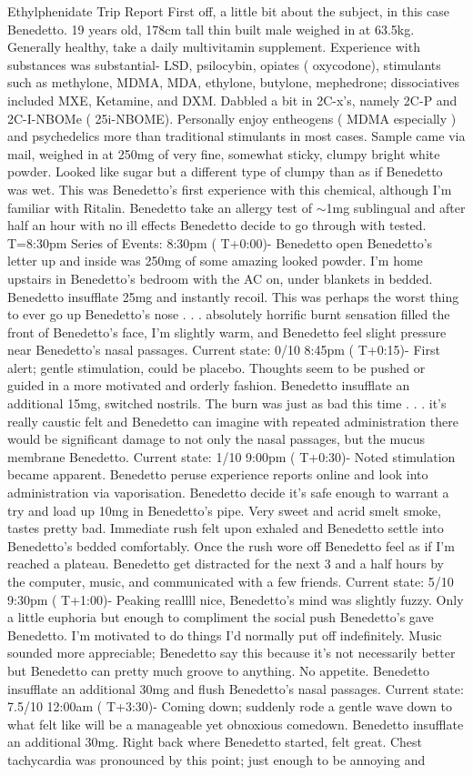 \documentclass[12pt]{book}
\begin{document}
Ethylphenidate Trip Report First off, a little bit about the subject, in this case Benedetto. 19 years old, 178cm tall thin built male weighed in at 63.5kg. Generally healthy, take a daily multivitamin supplement. Experience with substances was substantial- LSD, psilocybin, opiates ( oxycodone), stimulants such as methylone, MDMA, MDA, ethylone, butylone, mephedrone; dissociatives included MXE, Ketamine, and DXM. Dabbled a bit in 2C-x's, namely 2C-P and 2C-I-NBOMe ( 25i-NBOME). Personally enjoy entheogens ( MDMA especially ) and psychedelics more than traditional stimulants in most cases. Sample came via mail, weighed in at 250mg of very fine, somewhat sticky, clumpy bright white powder. Looked like sugar but a different type of clumpy than as if Benedetto was wet. This was Benedetto's first experience with this chemical, although I'm familiar with Ritalin. Benedetto take an allergy test of $\sim$1mg sublingual and after half an hour with no ill effects Benedetto decide to go through with tested. T=8:30pm Series of Events: 8:30pm ( T+0:00)- Benedetto open Benedetto's letter up and inside was 250mg of some amazing looked powder. I'm home upstairs in Benedetto's bedroom with the AC on, under blankets in bedded. Benedetto insufflate 25mg and instantly recoil. This was perhaps the worst thing to ever go up Benedetto's nose . . .  absolutely horrific burnt sensation filled the front of Benedetto's face, I'm slightly warm, and Benedetto feel slight pressure near Benedetto's nasal passages. Current state: 0/10 8:45pm ( T+0:15)- First alert; gentle stimulation, could be placebo. Thoughts seem to be pushed or guided in a more motivated and orderly fashion. Benedetto insufflate an additional 15mg, switched nostrils. The burn was just as bad this time . . .  it's really caustic felt and Benedetto can imagine with repeated administration there would be significant damage to not only the nasal passages, but the mucus membrane Benedetto. Current state: 1/10 9:00pm ( T+0:30)- Noted stimulation became apparent. Benedetto peruse experience reports online and look into administration via vaporisation. Benedetto decide it's safe enough to warrant a try and load up 10mg in Benedetto's pipe. Very sweet and acrid smelt smoke, tastes pretty bad. Immediate rush felt upon exhaled and Benedetto settle into Benedetto's bedded comfortably. Once the rush wore off Benedetto feel as if I'm reached a plateau. Benedetto get distracted for the next 3 and a half hours by the computer, music, and communicated with a few friends. Current state: 5/10 9:30pm ( T+1:00)- Peaking reallll nice, Benedetto's mind was slightly fuzzy. Only a little euphoria but enough to compliment the social push Benedetto's gave Benedetto. I'm motivated to do things I'd normally put off indefinitely. Music sounded more appreciable; Benedetto say this because it's not necessarily better but Benedetto can pretty much groove to anything. No appetite. Benedetto insufflate an additional 30mg and flush Benedetto's nasal passages. Current state: 7.5/10 12:00am ( T+3:30)- Coming down; suddenly rode a gentle wave down to what felt like will be a manageable yet obnoxious comedown. Benedetto insufflate an additional 30mg. Right back where Benedetto started, felt great. Chest tachycardia was pronounced by this point; just enough to be annoying and 
\end{document}
